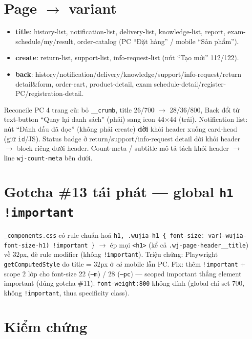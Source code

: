 \section{Page $\rightarrow$ variant}

\begin{itemize}
\item \textbf{title}: history-list, notification-list, delivery-list, knowledge-list, report,
      exam-schedule/my/result, order-catalog (PC ``Đặt hàng'' / mobile ``Sản phẩm'').
\item \textbf{create}: return-list, support-list, info-request-list (nút ``Tạo mới'' 112/122).
\item \textbf{back}: history/notification/delivery/knowledge/support/info-request/return
      detail\&form, order-cart, product-detail, exam schedule-detail/register-PC/registration-detail.
\end{itemize}

Reconcile PC 4 trang cũ: bỏ \texttt{\_\_crumb}, title 26/700 $\rightarrow$ 28/36/800, Back đổi từ
text-button ``Quay lại danh sách'' (phải) sang icon 44$\times$44 (trái). Notification list: nút
``Đánh dấu đã đọc'' (không phải create) \textbf{dời} khỏi header xuống card-head (giữ \texttt{id}/JS).
Status badge ở return/support/info-request detail dời khỏi header $\rightarrow$ block riêng dưới header.
Count-meta / subtitle mô tả tách khỏi header $\rightarrow$ line \texttt{wj-count-meta} bên dưới.

\section{Gotcha \#13 tái phát --- global \texttt{h1 !important}}

\texttt{\_components.css} có rule chuẩn-hoá \texttt{h1, .wujia-h1 \{ font-size:
var(--wujia-font-size-h1) !important \}} $\rightarrow$ ép mọi \texttt{<h1>} (kể cả
\texttt{.wj-page-header\_\_title}) về 32px, đè rule modifier (không \texttt{!important}). Triệu chứng:
Playwright \texttt{getComputedStyle} đo title = 32px ở \emph{cả} mobile lẫn PC. Fix: thêm
\texttt{!important} + scope 2 lớp cho font-size 22 (\texttt{--m}) / 28 (\texttt{--pc}) --- scoped
important thắng element important (đúng gotcha \#11). \texttt{font-weight:800} không dính (global chỉ
set 700, không \texttt{!important}, thua specificity class).

\section{Kiểm chứng}

